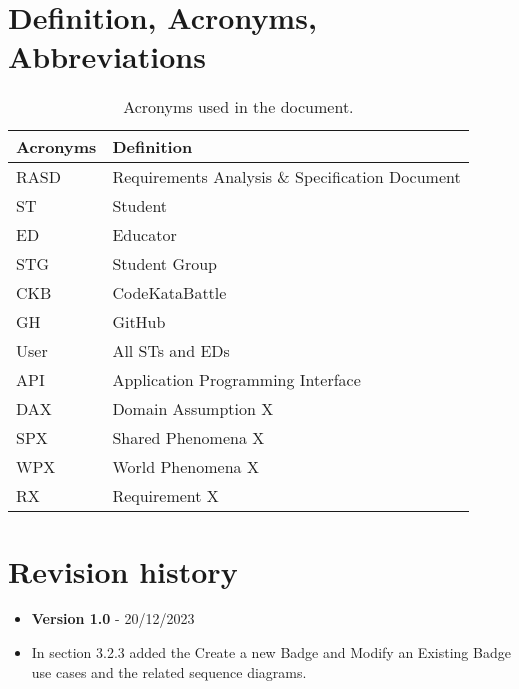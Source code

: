 \section{Definition, Acronyms, Abbreviations}
\label{sec:definition_acronyms_abbreviations}%
\begin{table}[H]
    \begin{center}
        \begin{tabular}{ |l|l| }
            \hline
            \textbf{Acronyms} & \textbf{Definition}                              \\
            \hline
            RASD             & Requirements Analysis \& Specification Document                      \\
            \hline
            ST              & Student                         \\
            \hline
            ED              & Educator                         \\
            \hline
            STG             & Student Group                    \\
            \hline
            CKB             & CodeKataBattle                   \\
            \hline
            GH              & GitHub                           \\
            \hline
            User            & All STs and EDs                           \\
            \hline
            API             & Application Programming Interface                           \\
            \hline
            DAX             & Domain Assumption X                           \\
            \hline
            SPX             & Shared Phenomena X                           \\
            \hline
            WPX             & World Phenomena X                           \\
            \hline
            RX              & Requirement X                           \\
            \hline
         \end{tabular}
        \caption{Acronyms used in the document.}
        \label{tab:acronyms}%
    \end{center}
\end{table}




\section{Revision history}
\label{sec:revision_history}%
\begin{itemize}
    \item \textbf{Version 1.0} - 20/12/2023
    \item In section 3.2.3 added the Create a new Badge and Modify an Existing Badge use cases and the related sequence diagrams.
\end{itemize}


